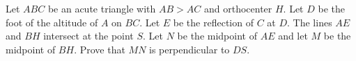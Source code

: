 Let $ABC$ be an acute triangle with $AB>AC$ and orthocenter $H$.
Let $D$ be the foot of the altitude of $A$ on $BC$. Let $E$ be the reflection of $C$ at $D$.
The lines $AE$ and $BH$ intersect at the point $S$.
Let $N$ be the midpoint of $AE$ and let $M$ be the midpoint of $BH$.
Prove that $MN$ is perpendicular to $DS$.